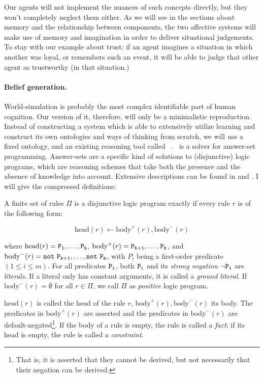Our agents will not implement the nuances of such concepts directly, but they won't completely neglect them either. As we will see in the sections about memory and the relationship between components, the two affective systems will make use of memory and imagination in order to deliver situational judgements. To stay with our example about trust: if an agent imagines a situation in which another was loyal, or remembers such an event, it will be able to judge that other agent as trustworthy (in that situation.)

\paragraph{Belief generation.} World-simulation is probably the most complex identifiable part of human cognition. Our version of it, therefore, will only be a minimalistic reproduction. Instead of constructing a system which is able to extensively utilize learning and construct its own ontologies and ways of thinking from scratch, we will use a fixed ontology, and an existing reasoning tool called \dlvhex\ \cite{dlvhex}. \dlvhex\ is a solver for answer-set programming. Answer-sets are a specific kind of solutions to (disjunctive) logic programs, which are reasoning schemes that take both the presence and the absence of knowledge into account. Extensive descriptions can be found in \cite{lifschitz2008} and \cite{baral2003}. I will give the compressed definitions:

\begin{definition}
	A finite set of rules $\Pi$ is a disjunctive logic program exactly if every rule $r$ is of the following form:
	
	$$
		\mathrm{head}(r) \leftarrow \mathrm{body}^+(r), \mathrm{body}^-(r)
	$$
	
	where $\mathrm{head}(r) = \mathtt{P_1},\dots,\mathtt{P_h}$, $\mathrm{body}^+(r) = \mathtt{P_{h+1}},\dots,\mathtt{P_k}$, and $\mathrm{body}^-(r) = \field{not\ P_{k+1}},\dots,\field{not\ P_m}$, with $P_i$ being a first-order predicate $(1\leq i \leq m)$. For all predicates $\mathtt{P_i}$, both $\mathtt{P_i}$ and its {\em strong negation} $\neg \mathtt{P_i}$ are {\em literals}. If a literal only has constant arguments, it is called a {\em ground literal}.
	If $\mathrm{body}^-(r) = \emptyset$ for all $r \in \Pi$, we call $\Pi$ as {\em positive} logic program.
	
	$\mathrm{head}(r) $ is called the head of the rule $r$, $\mathrm{body}^+(r),\mathrm{body}^-(r)$ its body. The predicates in $\mathrm{body}^+(r)$ are asserted and the predicates in $\mathrm{body}^-(r) $ are default-negated\footnote{That is, it is asserted that they cannot be derived, but not necessarily that their negation can be derived.}. If the body of a rule is empty, the rule is called a {\em fact}; if its head is empty, the rule is called a {\em constraint}.
\end{definition}

